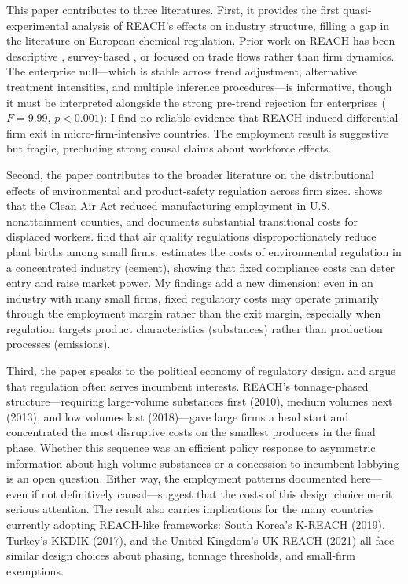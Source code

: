 \documentclass[12pt]{article}
\begin{document}
This paper contributes to three literatures. First, it provides the first quasi-experimental analysis of REACH's effects on industry structure, filling a gap in the literature on European chemical regulation. Prior work on REACH has been descriptive \citep{rip2010, christensen2011}, survey-based \citep{milieu2015}, or focused on trade flows \citep{dijk2021} rather than firm dynamics. The enterprise null---which is stable across trend adjustment, alternative treatment intensities, and multiple inference procedures---is informative, though it must be interpreted alongside the strong pre-trend rejection for enterprises ($F = 9.99$, $p < 0.001$): I find no reliable evidence that REACH induced differential firm exit in micro-firm-intensive countries. The employment result is suggestive but fragile, precluding strong causal claims about workforce effects.

Second, the paper contributes to the broader literature on the distributional effects of environmental and product-safety regulation across firm sizes. \citet{greenstone2002} shows that the Clean Air Act reduced manufacturing employment in U.S. nonattainment counties, and \citet{walker2013} documents substantial transitional costs for displaced workers. \citet{becker2000} find that air quality regulations disproportionately reduce plant births among small firms. \citet{ryan2012} estimates the costs of environmental regulation in a concentrated industry (cement), showing that fixed compliance costs can deter entry and raise market power. My findings add a new dimension: even in an industry with many small firms, fixed regulatory costs may operate primarily through the employment margin rather than the exit margin, especially when regulation targets product characteristics (substances) rather than production processes (emissions).

Third, the paper speaks to the political economy of regulatory design. \citet{stigler1971} and \citet{peltzman1976} argue that regulation often serves incumbent interests. REACH's tonnage-phased structure---requiring large-volume substances first (2010), medium volumes next (2013), and low volumes last (2018)---gave large firms a head start and concentrated the most disruptive costs on the smallest producers in the final phase. Whether this sequence was an efficient policy response to asymmetric information about high-volume substances or a concession to incumbent lobbying is an open question. Either way, the employment patterns documented here---even if not definitively causal---suggest that the costs of this design choice merit serious attention. The result also carries implications for the many countries currently adopting REACH-like frameworks: South Korea's K-REACH (2019), Turkey's KKDIK (2017), and the United Kingdom's UK-REACH (2021) all face similar design choices about phasing, tonnage thresholds, and small-firm exemptions.
\end{document}
